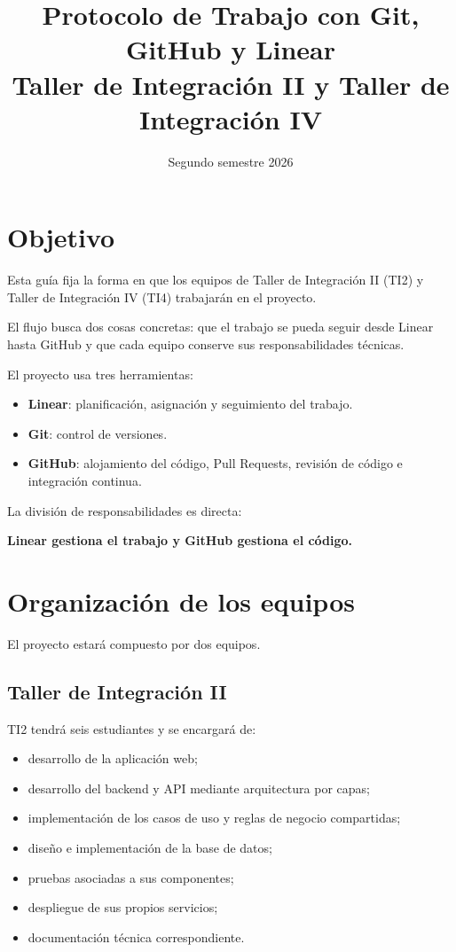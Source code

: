 \documentclass[11pt,a4paper]{article}
\title{
  \textbf{Protocolo de Trabajo con Git, GitHub y Linear}\\
  \large Taller de Integración II y Taller de Integración IV
}
\author{}
\date{Segundo semestre 2026}
\begin{document}
\maketitle

\section{Objetivo}

Esta guía fija la forma en que los equipos de Taller de Integración II (TI2) y
Taller de Integración IV (TI4) trabajarán en el proyecto.

El flujo busca dos cosas concretas: que el trabajo se pueda seguir desde Linear
hasta GitHub y que cada equipo conserve sus responsabilidades técnicas.

El proyecto usa tres herramientas:

\begin{itemize}
  \item \textbf{Linear}: planificación, asignación y seguimiento del trabajo.
  \item \textbf{Git}: control de versiones.
  \item \textbf{GitHub}: alojamiento del código, Pull Requests, revisión de
    código e integración continua.
\end{itemize}

La división de responsabilidades es directa:

\begin{center}
  \textbf{Linear gestiona el trabajo y GitHub gestiona el código.}
\end{center}


\section{Organización de los equipos}

El proyecto estará compuesto por dos equipos.

\subsection{Taller de Integración II}

TI2 tendrá seis estudiantes y se encargará de:

\begin{itemize}
  \item desarrollo de la aplicación web;
  \item desarrollo del backend y API mediante arquitectura por capas;
  \item implementación de los casos de uso y reglas de negocio compartidas;
  \item diseño e implementación de la base de datos;
  \item pruebas asociadas a sus componentes;
  \item despliegue de sus propios servicios;
  \item documentación técnica correspondiente.
\end{itemize}
\end{document}
